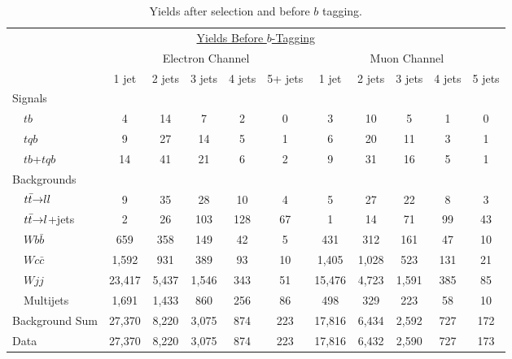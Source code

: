 \begin{table}[!h!tbp]
\begin{center}
\begin{minipage}{6in}
\begin{ruledtabular}
\begin{tabular}{l||ccccc|ccccc}
\multicolumn{11}{c}{\hspace{1in}\underline{Yields Before $b$-Tagging}} \vspace{0.1in} \\
& \multicolumn{5}{c|}{Electron Channel} & \multicolumn{5}{c}{Muon Channel} \\
                         & 1 jet & 2 jets & 3 jets & 4 jets & 5+ jets
                         & 1 jet & 2 jets & 3 jets & 4 jets & 5 jets \\
\hline
Signals                  &        &       &       &       &      &        &       &       &      &      \\
~~$tb$                   &      4 &    14 &     7 &     2 &    0 &      3 &    10 &     5 &    1 &    0 \\
~~$tqb$                  &      9 &    27 &    14 &     5 &    1 &      6 &    20 &    11 &    3 &    1 \\
~~$tb$+$tqb$             &     14 &    41 &    21 &     6 &    2 &      9 &    31 &    16 &    5 &    1 \\
Backgrounds              &        &       &       &       &      &        &       &       &      &      \\
~~${\mbox{$t\bar{t}$}}{\rightarrow}ll$     &      9 &    35 &    28 &    10 &    4 &      5 &    27 &    22 &    8 &    3 \\
~~${\mbox{$t\bar{t}$}}{\rightarrow}l$+jets &      2 &    26 &   103 &   128 &   67 &      1 &    14 &    71 &   99 &   43 \\
~~$Wb\bar{b}$            &    659 &   358 &   149 &    42 &    5 &    431 &   312 &   161 &   47 &   10 \\
~~$Wc\bar{c}$            &  1,592 &   931 &   389 &    93 &   10 &  1,405 & 1,028 &   523 &  131 &   21 \\
~~$Wjj$                  & 23,417 & 5,437 & 1,546 &   343 &   51 & 15,476 & 4,723 & 1,591 &  385 &   85 \\
~~Multijets              &  1,691 & 1,433 &   860 &   256 &   86 &    498 &   329 &   223 &   58 &   10 \\
\hline
Background Sum           & 27,370 & 8,220 & 3,075 &   874 &  223 & 17,816 & 6,434 & 2,592 &  727 &  172 \\
\hline
Data                     & 27,370 & 8,220 & 3,075 &   874 &  223 & 17,816 & 6,432 & 2,590 &  727 &  173 
\end{tabular}
\end{ruledtabular}
\vspace{-0.1in}
\caption[pretagyields]{Yields after selection and before $b$ tagging.}
\label{pretag-yields}
\end{minipage}
\end{center}
\end{table}

